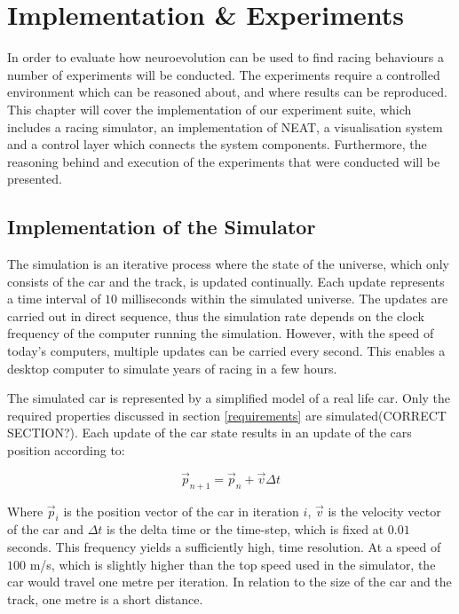 
\chapter{Implementation \& Experiments}
In order to evaluate how neuroevolution can be used to find racing behaviours a number of experiments will be conducted. The experiments require a controlled environment which can be reasoned about, and where results can be reproduced. This chapter will cover the implementation of our experiment suite, which includes a racing simulator, an implementation of NEAT, a visualisation system and a control layer which connects the system components. Furthermore, the reasoning behind and execution of the experiments that were conducted will be presented. 



\section{Implementation of the Simulator}

The simulation is an iterative process where the state of the universe, which only consists of the car and the track, is updated continually. Each update represents a time interval of $10$ milliseconds within the simulated universe. The updates are carried out in direct sequence, thus the simulation rate depends on the clock frequency of the computer running the simulation. However, with the speed of today's computers, multiple updates can be carried every second. This enables a desktop computer to simulate years of racing in a few hours. 

The simulated car is represented by a simplified model of a real life car. Only the required properties discussed in section \ref{requirements} are simulated(CORRECT SECTION?). Each update of the car state results in an update of the cars position according to:

\begin{equation}
    \vec{p}_{n+1} = \vec{p}_{n} + \vec{v}\Delta t 
\end{equation}

\noindent
Where $\vec{p}_i$ is the position vector of the car in iteration $i$, $\vec{v}$ is the velocity vector of the car and $\Delta t$ is the delta time or the time-step, which is fixed at $0.01$ seconds. This frequency yields a sufficiently high, time resolution. At a speed of $100$ m/s, which is slightly higher than the top speed used in the simulator, the car would travel one metre per iteration. In relation to the size of the car and the track, one metre is a short distance.

